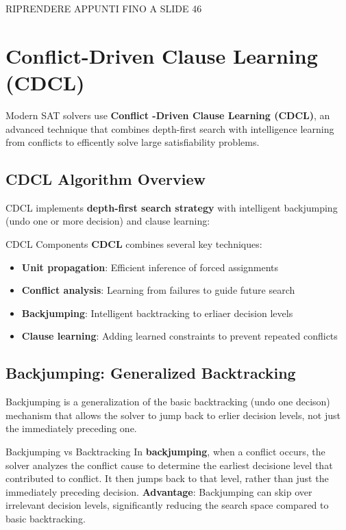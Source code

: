 \documentclass[a4paper]{article}
\theoremstyle{definition}
\begin{document}
RIPRENDERE APPUNTI FINO A SLIDE 46
\section{Conflict-Driven Clause Learning (CDCL)}
Modern SAT solvers use \textbf{Conflict -Driven Clause Learning (CDCL)}, an advanced 
technique that combines depth-first search with intelligence learning from conflicts 
to efficently solve large satisfiability problems.
\subsection{CDCL Algorithm Overview}
CDCL implements \textbf{depth-first search strategy} with intelligent backjumping (undo one or  more decision) 
and clause learning:
\begin{definition}{CDCL Components}
\centering \textbf{CDCL} combines several key techniques:
\begin{itemize}
    \item \textbf{Unit propagation}: Efficient inference of forced assignments
    \item \textbf{Conflict analysis}: Learning from failures to guide future search 
    \item \textbf{Backjumping}: Intelligent backtracking to erliaer decision levels
    \item \textbf{Clause learning}: Adding learned constraints to prevent repeated conflicts
\end{itemize}
\end{definition}
\subsection{Backjumping: Generalized Backtracking}
Backjumping is a generalization of the basic backtracking (undo one decison) mechanism that allows 
the solver to jump back to erlier decision levels, not just the immediately preceding one.
\begin{definition}{Backjumping vs Backtracking}
\centering In \textbf{backjumping}, when a conflict occurs, the solver 
analyzes the conflict cause to determine the earliest decisione level that contributed to conflict.
It then jumps back to that level, rather than just the immediately preceding decision.
\vspace{1em}
\noindent
\newline
\textbf{Advantage}: Backjumping can skip over irrelevant decision levels, significantly reducing 
the search space compared to basic backtracking.
\end{definition}
\end{document}
